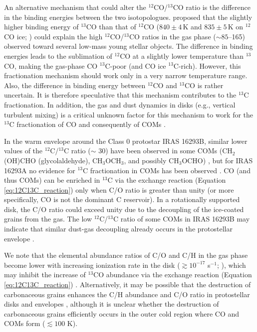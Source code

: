 \documentclass[linenumbers, twocolumn, twocolappendix, astrosymb, times]{aastex631}
\newcommand{\methylformate}{CH$_3$OCHO\xspace}
\newcommand{\dimethylether}{CH$_3$OCH$_3$\xspace}
\begin{document}
An alternative mechanism that could alter the $^{12}$CO/$^{13}$CO ratio is the difference in the binding energies between the two isotopologues. \citet{Smith2015} proposed that the slightly higher binding energy of $^{13}$CO than that of $^{12}$CO ($840\pm4$\,K and $835\pm5$\,K on $^{12}$CO ice; \citealt{Smith2021}) could explain the high $^{12}$CO/$^{13}$CO ratios in the gas phase ($\sim85$--165) observed toward several low-mass young stellar objects. The difference in binding energies leads to the sublimation of $^{12}$CO at a slightly lower temperature than $^{13}$CO, making the gas-phase CO $^{13}$C-poor (and CO ice $^{13}$C-rich). However, this fractionation mechanism should work only in a very narrow temperature range. Also, the difference in binding energy between $^{12}$CO and $^{13}$CO is rather uncertain. It is therefore speculative that this mechanism contributes to the $^{13}$C fractionation. In addition, the gas and dust dynamics in disks (e.g., vertical turbulent mixing) is a critical unknown factor for this mechanism to work for the $^{13}$C fractionation of CO and consequently of COMs \citep[e.g.,][]{Yoshida2022_12CO13CO}.


In the warm envelope around the Class 0 protostar IRAS 16293B, similar lower values of the $^{12}$C/$^{13}$C ratio ($\sim$ 30) have been observed in some COMs (CH$_2$(OH)CHO (glycolaldehyde), \dimethylether, and possibly \methylformate) \citep[see Table \ref{tab:12C13C_summary};][]{Jorgensen2016, Jorgensen2018}, but for IRAS 16293A no evidence for $^{13}$C fractionation in COMs has been observed \citep[Table \ref{tab:12C13C_summary};][]{Manigand2020}. CO (and thus COMs) can be enriched in $^{13}$C via the exchange reaction (Equation \ref{eq:12C13C_reaction}) only when C/O ratio is greater than unity (or more specifically, CO is not the dominant C reservoir). In a rotationally supported disk, the C/O ratio could exceed unity due to the decoupling of the ice-coated grains from the gas. The low $^{12}$C/$^{13}$C ratio of some COMs in IRAS 16293B may indicate that similar dust-gas decoupling already occurs in the protostellar envelope \citep[e.g.,][]{Koga2022}. 

We note that the elemental abundance ratios of C/O and C/H in the gas phase become lower with increasing ionization rate in the disk ($\gtrsim10^{-17}$ s$^{-1}$; \citealt{Eistrup2016, Schwarz2018, Notsu2020}), which may inhibit the increase of $^{13}$CO abundance via the exchange reaction (Equation \ref{eq:12C13C_reaction}) \citep{Woods2009}. Alternatively, it may be possible that the destruction of carbonaceous grains enhances the C/H abundance and C/O ratio in protostellar disks and envelopes \citep[e.g.,][]{Wei2019, vantHoff2020}, although it is unclear whether the destruction of carbonaceous grains efficiently occurs in the outer cold region where CO and COMs form ($\lesssim100$ K).
\end{document}

